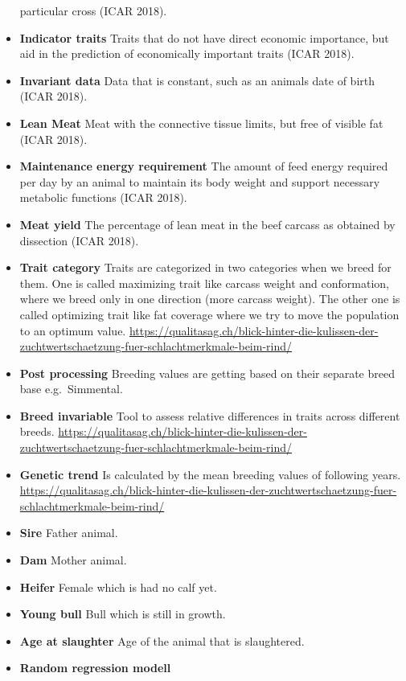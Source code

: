 \documentclass[]{article}
\begin{document}
\begin{itemize}
  particular cross (ICAR 2018).
\item
  \textbf{Indicator traits} Traits that do not have direct economic
  importance, but aid in the prediction of economically important traits
  (ICAR 2018).
\item
  \textbf{Invariant data} Data that is constant, such as an animals date
  of birth (ICAR 2018).
\item
  \textbf{Lean Meat} Meat with the connective tissue limits, but free of
  visible fat (ICAR 2018).
\item
  \textbf{Maintenance energy requirement} The amount of feed energy
  required per day by an animal to maintain its body weight and support
  necessary metabolic functions (ICAR 2018).
\item
  \textbf{Meat yield} The percentage of lean meat in the beef carcass as
  obtained by dissection (ICAR 2018).
\item
  \textbf{Trait category} Traits are categorized in two categories when
  we breed for them. One is called maximizing trait like carcass weight
  and conformation, where we breed only in one direction (more carcass
  weight). The other one is called optimizing trait like fat coverage
  where we try to move the population to an optimum value.
  \url{https://qualitasag.ch/blick-hinter-die-kulissen-der-zuchtwertschaetzung-fuer-schlachtmerkmale-beim-rind/}
\item
  \textbf{Post processing} Breeding values are getting based on their
  separate breed base e.g.~Simmental.
\item
  \textbf{Breed invariable} Tool to assess relative differences in
  traits across different breeds.
  \url{https://qualitasag.ch/blick-hinter-die-kulissen-der-zuchtwertschaetzung-fuer-schlachtmerkmale-beim-rind/}
\item
  \textbf{Genetic trend} Is calculated by the mean breeding values of
  following years.
  \url{https://qualitasag.ch/blick-hinter-die-kulissen-der-zuchtwertschaetzung-fuer-schlachtmerkmale-beim-rind/}
\item
  \textbf{Sire} Father animal.
\item
  \textbf{Dam} Mother animal.
\item
  \textbf{Heifer} Female which is had no calf yet.
\item
  \textbf{Young bull} Bull which is still in growth.
\item
  \textbf{Age at slaughter} Age of the animal that is slaughtered.
\item
  \textbf{Random regression modell}

\end{itemize}
\end{document}
